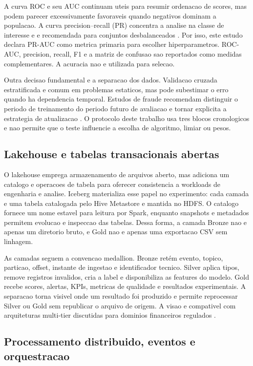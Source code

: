 \documentclass[10pt,twocolumn]{article}
\begin{document}
A curva ROC e seu AUC continuam uteis para resumir ordenacao de scores, mas podem parecer excessivamente favoraveis quando negativos dominam a populacao. A curva precision--recall (PR) concentra a analise na classe de interesse e e recomendada para conjuntos desbalanceados \cite{davis2006,saito2015}. Por isso, este estudo declara PR-AUC como metrica primaria para escolher hiperparametros. ROC-AUC, precision, recall, F1 e a matriz de confusao sao reportados como medidas complementares. A acuracia nao e utilizada para selecao.

Outra decisao fundamental e a separacao dos dados. Validacao cruzada estratificada e comum em problemas estaticos, mas pode subestimar o erro quando ha dependencia temporal. Estudos de fraude recomendam distinguir o periodo de treinamento do periodo futuro de avaliacao e tornar explicita a estrategia de atualizacao \cite{dalpozzolo2018}. O protocolo deste trabalho usa tres blocos cronologicos e nao permite que o teste influencie a escolha de algoritmo, limiar ou pesos.

\subsection{Lakehouse e tabelas transacionais abertas}

O lakehouse emprega armazenamento de arquivos aberto, mas adiciona um catalogo e operacoes de tabela para oferecer consistencia a workloads de engenharia e analise. Iceberg materializa esse papel no experimento: cada camada e uma tabela catalogada pelo Hive Metastore e mantida no HDFS. O catalogo fornece um nome estavel para leitura por Spark, enquanto snapshots e metadados permitem evolucao e inspeccao das tabelas. Dessa forma, a camada Bronze nao e apenas um diretorio bruto, e Gold nao e apenas uma exportacao CSV sem linhagem.

As camadas seguem a convencao medallion. Bronze retém evento, topico, particao, offset, instante de ingestao e identificador tecnico. Silver aplica tipos, remove registros invalidos, cria a label e disponibiliza as features do modelo. Gold recebe scores, alertas, KPIs, metricas de qualidade e resultados experimentais. A separacao torna visivel onde um resultado foi produzido e permite reprocessar Silver ou Gold sem republicar o arquivo de origem. A visao e compativel com arquiteturas multi-tier discutidas para dominios financeiros regulados \cite{bfsilakehouse2023,allam2024}.

\subsection{Processamento distribuido, eventos e orquestracao}
\end{document}

